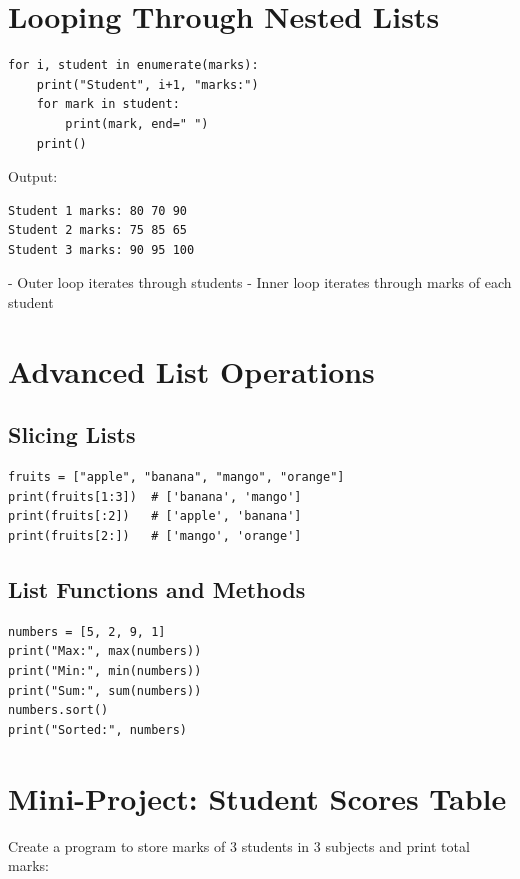\section{Looping Through Nested Lists}

\begin{verbatim}
for i, student in enumerate(marks):
    print("Student", i+1, "marks:")
    for mark in student:
        print(mark, end=" ")
    print()
\end{verbatim}

Output:

\begin{verbatim}
Student 1 marks: 80 70 90
Student 2 marks: 75 85 65
Student 3 marks: 90 95 100
\end{verbatim}

- Outer loop iterates through students  
- Inner loop iterates through marks of each student  

\section{Advanced List Operations}

\subsection{Slicing Lists}

\begin{verbatim}
fruits = ["apple", "banana", "mango", "orange"]
print(fruits[1:3])  # ['banana', 'mango']
print(fruits[:2])   # ['apple', 'banana']
print(fruits[2:])   # ['mango', 'orange']
\end{verbatim}

\subsection{List Functions and Methods}

\begin{verbatim}
numbers = [5, 2, 9, 1]
print("Max:", max(numbers))
print("Min:", min(numbers))
print("Sum:", sum(numbers))
numbers.sort()
print("Sorted:", numbers)
\end{verbatim}

\section{Mini-Project: Student Scores Table}

Create a program to store marks of 3 students in 3 subjects and print total marks:

